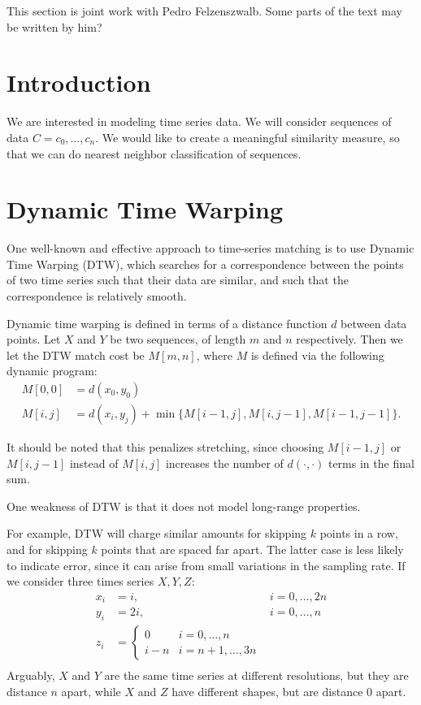 This section is joint work with Pedro Felzenszwalb. Some parts of the
text may be written by him?

\section{Introduction}
We are interested in modeling time series data. We will consider
sequences of data $C=c_0, \dots, c_n$. We would like to create a
meaningful similarity measure, so that we can do nearest neighbor
classification of sequences. 

\section{Dynamic Time Warping}

One well-known and effective approach to time-series matching is to
use Dynamic Time Warping (DTW), which searches for a correspondence
between the points of two time series such that their data are
similar, and such that the correspondence is relatively smooth.

Dynamic time warping is defined in terms of a distance function $d$
between data points. Let $X$ and $Y$ be two sequences, of length $m$
and $n$ respectively. Then we let the DTW match cost be
$M[m,n]$, where $M$ is defined via the following dynamic program:
\begin{align*}
M[0,0] &= d(x_0, y_0) \\
M[i,j] &= d(x_i,y_j) + \min \{ M[i-1,j], M[i,j-1], M[i-1,j-1]\}.
\end{align*}

It should be noted that this penalizes stretching, since choosing
$M[i-1,j]$ or $M[i,j-1]$ instead of $M[i,j]$ increases the number of
  $d(\cdot,\cdot)$ terms in the final sum.

One weakness of DTW is that it does not model long-range
properties. 

\begin{ex}
\label{stretch-problem}
For example, DTW will charge similar amounts for skipping
$k$ points in a row, and for skipping $k$ points that are spaced far
apart. The latter case is less likely to indicate error, since it can
arise from small variations in the sampling rate. If we consider three
times series $X,Y,Z$:
\begin{align*}
x_i &= i, &i=0, \dots, 2n\\
y_i &= 2i, &i=0, \dots, n\\
z_i &= \begin{cases} 0 & i=0,\dots, n\\ i-n & i=n+1, \dots, 3n\end{cases}\\
\end{align*}
Arguably, $X$ and $Y$ are the same time series at different
resolutions, but they are distance $n$ apart, while $X$ and $Z$ have
different shapes, but are distance $0$ apart.
\end{ex}

